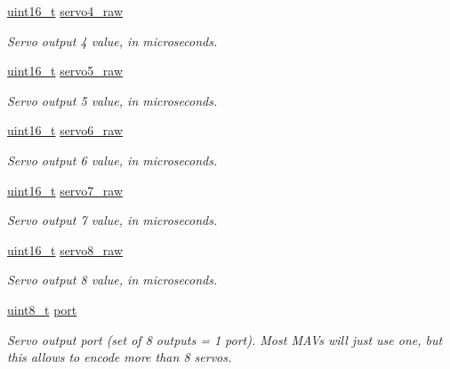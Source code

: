 \begin{DoxyCompactItemize}
\hyperlink{stdint_8h_a273cf69d639a59973b6019625df33e30}{uint16\-\_\-t} \hyperlink{struct____mavlink__servo__output__raw__t_aa9a775a58d71f44c00955771dc758012}{servo4\-\_\-raw}
\begin{DoxyCompactList}\small\item\em Servo output 4 value, in microseconds. \end{DoxyCompactList}\item 
\hyperlink{stdint_8h_a273cf69d639a59973b6019625df33e30}{uint16\-\_\-t} \hyperlink{struct____mavlink__servo__output__raw__t_a2cc4f07c7398f753b56acd16f195df6a}{servo5\-\_\-raw}
\begin{DoxyCompactList}\small\item\em Servo output 5 value, in microseconds. \end{DoxyCompactList}\item 
\hyperlink{stdint_8h_a273cf69d639a59973b6019625df33e30}{uint16\-\_\-t} \hyperlink{struct____mavlink__servo__output__raw__t_a101f4294794034f15a5afe3a1e980b2e}{servo6\-\_\-raw}
\begin{DoxyCompactList}\small\item\em Servo output 6 value, in microseconds. \end{DoxyCompactList}\item 
\hyperlink{stdint_8h_a273cf69d639a59973b6019625df33e30}{uint16\-\_\-t} \hyperlink{struct____mavlink__servo__output__raw__t_acc5571463987b3d5079ab1afb2556895}{servo7\-\_\-raw}
\begin{DoxyCompactList}\small\item\em Servo output 7 value, in microseconds. \end{DoxyCompactList}\item 
\hyperlink{stdint_8h_a273cf69d639a59973b6019625df33e30}{uint16\-\_\-t} \hyperlink{struct____mavlink__servo__output__raw__t_a1bf5dcc6a436529fc0d89ebf56d2a980}{servo8\-\_\-raw}
\begin{DoxyCompactList}\small\item\em Servo output 8 value, in microseconds. \end{DoxyCompactList}\item 
\hyperlink{stdint_8h_aba7bc1797add20fe3efdf37ced1182c5}{uint8\-\_\-t} \hyperlink{struct____mavlink__servo__output__raw__t_aa82c0841e17f4206e8b78c324ad407aa}{port}
\begin{DoxyCompactList}\small\item\em Servo output port (set of 8 outputs = 1 port). Most M\-A\-Vs will just use one, but this allows to encode more than 8 servos. \end{DoxyCompactList}\end{DoxyCompactItemize}


